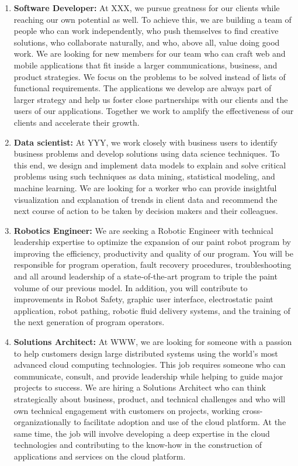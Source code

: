 \documentclass[]{book}
\providecommand{\tightlist}{%
  \setlength{\itemsep}{0pt}\setlength{\parskip}{0pt}}
\begin{document}
\begin{enumerate}
\def\labelenumi{\arabic{enumi}.}
\tightlist
\item
  \textbf{Software Developer:} At XXX, we pursue greatness for our clients while reaching our own potential as well. To achieve this, we are building a team of people who can work independently, who push themselves to find creative solutions, who collaborate naturally, and who, above all, value doing good work. We are looking for new members for our team who can craft web and mobile applications that fit inside a larger communications, business, and product strategies. We focus on the problems to be solved instead of lists of functional requirements. The applications we develop are always part of larger strategy and help us foster close partnerships with our clients and the users of our applications. Together we work to amplify the effectiveness of our clients and accelerate their growth.
\item
  \textbf{Data scientist:} At YYY, we work closely with business users to identify business problems and develop solutions using data science techniques. To this end, we design and implement data models to explain and solve critical problems using such techniques as data mining, statistical modeling, and machine learning. We are looking for a worker who can provide insightful visualization and explanation of trends in client data and recommend the next course of action to be taken by decision makers and their colleagues.
\item
  \textbf{Robotics Engineer:} We are seeking a Robotic Engineer with technical leadership expertise to optimize the expansion of our paint robot program by improving the efficiency, productivity and quality of our program. You will be responsible for program operation, fault recovery procedures, troubleshooting and all around leadership of a state-of-the-art program to triple the paint volume of our previous model. In addition, you will contribute to improvements in Robot Safety, graphic user interface, electrostatic paint application, robot pathing, robotic fluid delivery systems, and the training of the next generation of program operators.
\item
  \textbf{Solutions Architect:} At WWW, we are looking for someone with a passion to help customers design large distributed systems using the world's most advanced cloud computing technologies. This job requires someone who can communicate, consult, and provide leadership while helping to guide major projects to success. We are hiring a Solutions Architect who can think strategically about business, product, and technical challenges and who will own technical engagement with customers on projects, working cross-organizationally to facilitate adoption and use of the cloud platform. At the same time, the job will involve developing a deep expertise in the cloud technologies and contributing to the know-how in the construction of applications and services on the cloud platform.
\end{enumerate}
\end{document}
